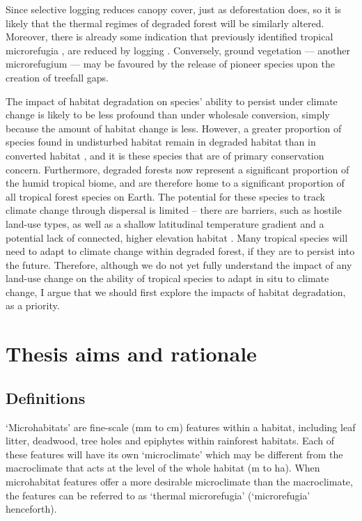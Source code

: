 \documentclass[12pt,a4paper,]{report}
\theoremstyle{definition}
\theoremstyle{definition}
\theoremstyle{definition}
\theoremstyle{remark}
\begin{document}
Since selective logging reduces canopy cover, just as deforestation
does, so it is likely that the thermal regimes of degraded forest will
be similarly altered. Moreover, there is already some indication that
previously identified tropical microrefugia \citep[in this case, leaf
litter and soil;][]{scheffers_microhabitats2014}, are reduced by logging
\citep{saner_reduced2009}. Conversely, ground vegetation --- another
microrefugium \citep{scheffers_microhabitats2014} --- may be favoured by
the release of pioneer species upon the creation of treefall gaps.

The impact of habitat degradation on species' ability to persist under
climate change is likely to be less profound than under wholesale
conversion, simply because the amount of habitat change is less.
However, a greater proportion of species found in undisturbed habitat
remain in degraded habitat than in converted habitat
\citep{edwards_degraded2011}, and it is these species that are of
primary conservation concern. Furthermore, degraded forests now
represent a significant proportion of the humid tropical biome, and are
therefore home to a significant proportion of all tropical forest
species on Earth. The potential for these species to track climate
change through dispersal is limited -- there are barriers, such as
hostile land-use types, as well as a shallow latitudinal temperature
gradient \citep{colwell_global2008} and a potential lack of connected,
higher elevation habitat \citep{scriven_protected2015}. Many tropical
species will need to adapt to climate change within degraded forest, if
they are to persist into the future. Therefore, although we do not yet
fully understand the impact of any land-use change on the ability of
tropical species to adapt in situ to climate change, I argue that we
should first explore the impacts of habitat degradation, as a priority.

\section{Thesis aims and rationale}\label{thesis-aims-and-rationale}

\subsection{Definitions}\label{definitions}

`Microhabitats' are fine-scale (mm to cm) features within a habitat,
including leaf litter, deadwood, tree holes and epiphytes within
rainforest habitats. Each of these features will have its own
`microclimate' which may be different from the macroclimate that acts at
the level of the whole habitat (m to ha). When microhabitat features
offer a more desirable microclimate than the macroclimate, the features
can be referred to as `thermal microrefugia' (`microrefugia'
henceforth).
\end{document}
